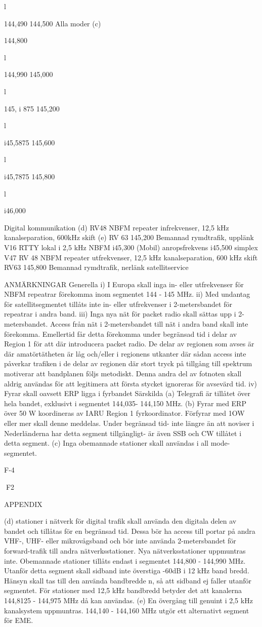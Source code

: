 l

144,490
144,500
Alla moder (c)

144,800

l

144,990
145,000

l

145, i 875
145,200

l

i45,5875
145,600

l

i45,7875
145,800

l

i46,000

Digital kommunikation (d)
RV48
NBFM repeater infrekvenser, 12,5 kHz kanalseparation, 600kHz skift (e)
RV 63
145,200
Bemannad rymdtrafik, upplänk
V16
RTTY lokal
i 2,5 kHz NBFM
i45,300
(Mobil) anropsfrekvens
i45,500
simplex
V47
RV 48
NBFM repeater utfrekvenser, 12,5 kHz kanalseparation, 600 kHz skift
RV63
145,800
Bemannad rymdtrafik, nerlänk
satellitservice

ANMÄRKNINGAR
Generella
i) I Europa skall inga in- eller utfrekvenser för NBFM repeatrar förekomma inom segmentet 144 - 145 MHz.
ii) Med undantag för satellitsegmentet tillåts inte in- eller utfrekvenser i 2-metersbandet för repeatrar i andra band.
iii) Inga nya nät för packet radio skall sättas upp i 2-metersbandet.
Access från nät i 2-metersbandet till nät i andra band skall inte förekomma. Emellertid får detta förekomma
under begränsad tid i delar av Region 1 för att där introducera packet radio. De delar av regionen som avses är
där amatörtätheten är låg och/eller i regionens utkanter där sådan access inte påverkar trafiken i de delar av
regionen där stort tryck på tillgång till spektrum motiverar att bandplanen följs metodiskt. Denna andra del av
fotnoten skall aldrig användas för att legitimera att första stycket ignoreras för avsevärd tid.
iv) Fyrar skall oavsett ERP ligga i fyrbandet
Särskilda
(a) Telegrafi är tillåtet över hela bandet, exklusivt i segmentet 144,035- 144,150 MHz.
(b) Fyrar med ERP över 50 W koordineras av IARU Region 1 fyrkoordinator. Förfyrar med 1OW eller mer skall denne
meddelas. Under begränsad tid- inte längre än att noviser i Nederländerna har detta segment tillgängligt- är
även SSB och CW tillåtet i detta segment.
(c) Inga obemannade stationer skall användas i all mode-segmentet.

F-4

F2

APPENDIX

(d) stationer i nätverk för digital trafik skall använda den digitala delen av bandet och tillåtas för en begränsad tid.
Dessa bör ha access till portar på andra VHF-, UHF- eller mikrovågsband och bör inte använda 2-metersbandet
för forward-trafik till andra nätverksstationer. Nya nätverksstationer uppmuntras inte. Obemannade stationer
tillåts endast i segmentet 144,800 - 144,990 MHz. Utanför detta segment skall sidband inte överstiga -60dB i 12
kHz band bredd. Hänsyn skall tas till den använda bandbredde n, så att sidband ej faller utanför segmentet. För
stationer med 12,5 kHz bandbredd betyder det att kanalerna 144,8125 - 144,975 MHz då kan användas.
(e) En övergång till genuint i 2,5 kHz kanalsystem uppmuntras.
144,140 - 144,160 MHz utgör ett alternativt segment för EME.

